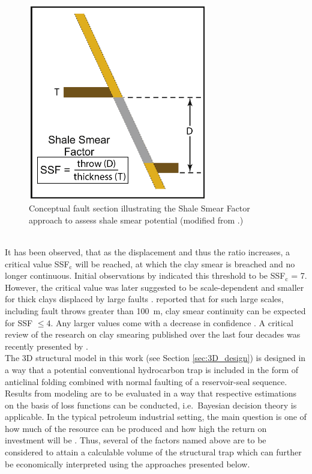 		\begin{figure}[h]
			\centering
			\includegraphics[width=0.7\textwidth]{Figures/SSF.PNG}
			\caption{Conceptual fault section illustrating the Shale Smear Factor approach to assess shale smear potential (modified from \citet{vrolijk2016clay}.)}\label{fig:ssf}
		\end{figure}\\
		It has been observed, that as the displacement and thus the ratio increases, a critical value SSF$_\text{c}$ will be reached, at which the clay smear is breached and no longer continuous. Initial observations by \citet{lindsay1993outcrop} indicated this threshold to be SSF$_\text{c}$ = 7. However, the critical value was later suggested to be scale-dependent and smaller for thick clays displaced by large faults \citep{yielding2012using}. \citet{faerseth2006shale} reported that for such large scales, including fault throws greater than 100~m, clay smear continuity can be expected for SSF $\le4$. Any larger values come with a decrease in confidence \citep{faerseth2006shale}. A critical review of the research on clay smearing published over the last four decades was recently presented by \citet{vrolijk2016clay}.\\
        The 3D structural model in this work (see Section \ref{sec:3D_design}) is designed in a way that a potential conventional hydrocarbon trap is included in the form of anticlinal folding combined with normal faulting of a reservoir-seal sequence. Results from modeling are to be evaluated in a way that respective estimations on the basis of loss functions can be conducted, i.e.\ Bayesian decision theory is applicable. In the typical petroleum industrial setting, the main question is one of how much of the resource can be produced and how high the return on investment will be \citep{dean2007volumetric}. Thus, several of the factors named above are to be considered to attain a calculable volume of the structural trap which can further be economically interpreted using the approaches presented below.
        
